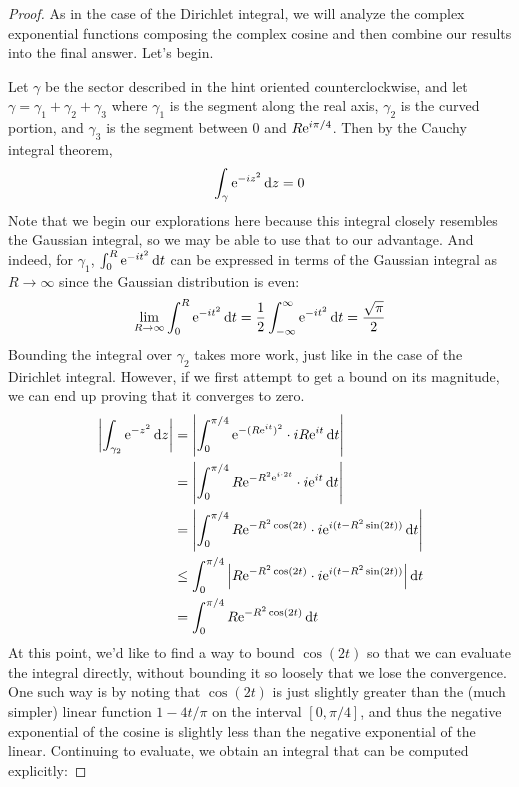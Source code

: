 \documentclass[../psets.tex]{subfiles}
\begin{document}
\begin{enumerate}[label={\textbf{\arabic*.}}]
\begin{proof}
        As in the case of the Dirichlet integral, we will analyze the complex exponential functions composing the complex cosine and then combine our results into the final answer. Let's begin.\par
        Let $\gamma$ be the sector described in the hint oriented counterclockwise, and let $\gamma=\gamma_1+\gamma_2+\gamma_3$ where $\gamma_1$ is the segment along the real axis, $\gamma_2$ is the curved portion, and $\gamma_3$ is the segment between 0 and $R\e[i\pi/4]$. Then by the Cauchy integral theorem,
        \begin{equation*}
            \int_\gamma\e[-iz^2]\dd{z} = 0
        \end{equation*}
        Note that we begin our explorations here because this integral closely resembles the Gaussian integral, so we may be able to use that to our advantage. And indeed, for $\gamma_1$, $\int_0^R\e[-it^2]\dd{t}$ can be expressed in terms of the Gaussian integral as $R\to\infty$ since the Gaussian distribution is even:
        \begin{equation*}
            \lim_{R\to\infty}\int_0^R\e[-it^2]\dd{t} = \frac{1}{2}\int_{-\infty}^\infty\e[-it^2]\dd{t}
            = \frac{\sqrt{\pi}}{2}
        \end{equation*}
        Bounding the integral over $\gamma_2$ takes more work, just like in the case of the Dirichlet integral. However, if we first attempt to get a bound on its magnitude, we can end up proving that it converges to zero.
        \begin{align*}
            \left| \int_{\gamma_2}\e[-z^2]\dd{z} \right| &= \left| \int_0^{\pi/4}\e[{-(R\e[it])^2}]\cdot iR\e[it]\dd{t} \right|\\
            &= \left| \int_0^{\pi/4}R\e[{-R^2\e[i\cdot 2t]}]\cdot i\e[it]\dd{t} \right|\\
            &= \left| \int_0^{\pi/4}R\e[-R^2\cos(2t)]\cdot i\e[i(t-R^2\sin(2t))]\dd{t} \right|\\
            &\leq \int_0^{\pi/4}\left| R\e[-R^2\cos(2t)]\cdot i\e[i(t-R^2\sin(2t))] \right|\dd{t}\\
            &= \int_0^{\pi/4}R\e[-R^2\cos(2t)]\dd{t}
        \end{align*}
        At this point, we'd like to find a way to bound $\cos(2t)$ so that we can evaluate the integral directly, without bounding it so loosely that we lose the convergence. One such way is by noting that $\cos(2t)$ is just slightly greater than the (much simpler) linear function $1-4t/\pi$ on the interval $[0,\pi/4]$, and thus the negative exponential of the cosine is slightly less than the negative exponential of the linear. Continuing to evaluate, we obtain an integral that can be computed explicitly:

\end{proof}
\end{enumerate}
\end{document}
